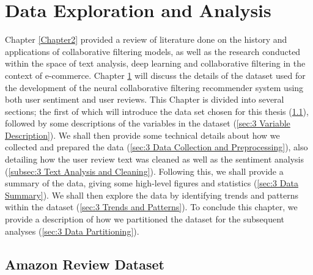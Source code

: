 \chapter{Data Exploration and Analysis} %

\label{Chapter3} %

Chapter \ref{Chapter2} provided a review of literature done on the history and applications of collaborative filtering models, as well as the research conducted within the space of text analysis, deep learning and collaborative filtering in the context of e-commerce. Chapter \ref{Chapter3} will discuss the details of the dataset used for the development of the neural collaborative filtering recommender system using both user sentiment and user reviews. This Chapter is divided into several sections; the first of which will introduce the data set chosen for this thesis (\ref{subsec:3 Amazon Review Dataset}), followed by some descriptions of the variables in the dataset (\ref{sec:3 Variable Description}). We shall then provide some technical details about how we collected and prepared the data (\ref{sec:3 Data Collection and Preprocessing}), also detailing how the user review text was cleaned as well as the sentiment analysis (\ref{subsec:3 Text Analysis and Cleaning}). Following this, we shall provide a summary of the data, giving some high-level figures and statistics (\ref{sec:3 Data Summary}). We shall then explore the data by identifying trends and patterns within the dataset (\ref{sec:3 Trends and Patterns}). To conclude this chapter, we provide a description of how we partitioned the dataset for the subsequent analyses (\ref{sec:3 Data Partitioning}). 

\section{Amazon Review Dataset}
\label{subsec:3 Amazon Review Dataset}

